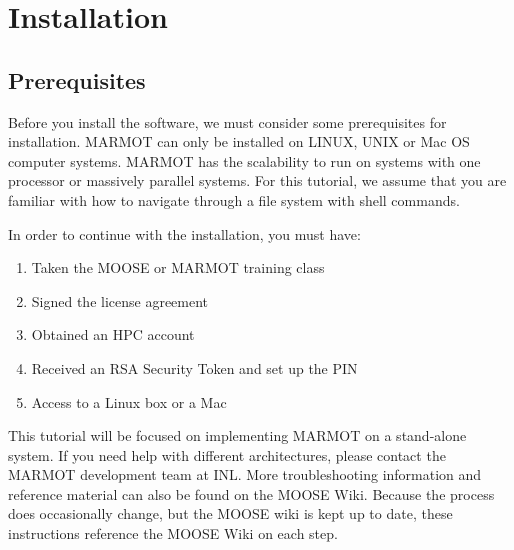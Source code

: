 \documentclass[letter,12pt,fleqn]{article}
\begin{document}
\section{Installation}

\subsection{Prerequisites}

Before you install the software, we must consider some prerequisites for installation. MARMOT can only be installed on LINUX, UNIX or Mac OS computer systems. MARMOT has the scalability to run on systems with one processor or massively parallel systems. For this tutorial, we assume that you are familiar with how to navigate through a file system with shell commands. 

In order to continue with the installation, you must have:
\begin{enumerate}
\item Taken the MOOSE or MARMOT training class
\item Signed the license agreement 
\item Obtained an HPC account
\item Received an RSA Security Token and set up the PIN
\item Access to a Linux box or a Mac
\end{enumerate}

This tutorial will be focused on implementing MARMOT on a stand-alone system. If you need help with different architectures, please contact the MARMOT development team at INL. More troubleshooting information and reference material can also be found on the MOOSE Wiki. Because the process does occasionally change, but the MOOSE wiki is kept up to date, these instructions reference the MOOSE Wiki on each step.
\end{document}
